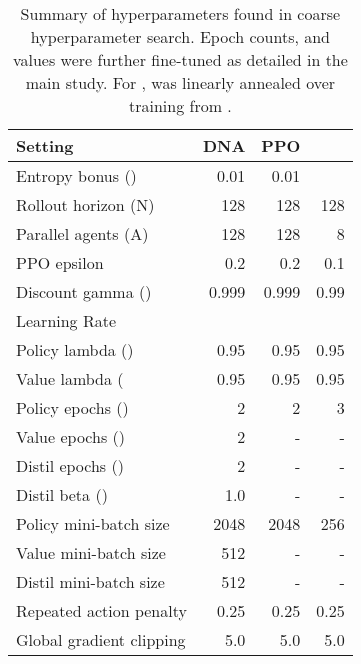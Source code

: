 \documentclass{article}
\begin{document}
\begin{table}[h]
    \centering
    
    \begin{tabular}{l r r r }
    \toprule
        Setting & DNA & PPO &  \\
    \midrule
Entropy bonus ()   & 0.01 & 0.01 &   \\ 
        Rollout horizon (N)             & 128 & 128 & 128 \\
        Parallel agents (A)             & 128 & 128 & 8 \\
        PPO epsilon           & 0.2 & 0.2 & 0.1 \\
        Discount gamma ()       & 0.999 & 0.999 & 0.99 \\


        Learning Rate                   &  &  &  \\
        
        Policy lambda ()   & 0.95 & 0.95 & 0.95 \\ 
        Value lambda (     & 0.95 & 0.95 & 0.95 \\ 
        
        Policy epochs ()         & 2 & 2 & 3 \\
        Value epochs ()            & 2 & - & - \\
        Distil epochs ()           & 2 & - & - \\
        Distil beta ()           & 1.0 & - & - \\
        
        Policy mini-batch size          & 2048 & 2048 & 256 \\ 
        Value mini-batch size           & 512 & - & - \\
        Distil mini-batch size          & 512 & - & - \\
        Repeated action penalty         & 0.25 & 0.25 & 0.25 \\ 
        Global gradient clipping        & 5.0 & 5.0 & 5.0 \\ 
        
    \bottomrule
    \end{tabular}
        
    \caption{Summary of hyperparameters found in coarse hyperparameter search. Epoch counts, and  values were further fine-tuned as detailed in the main study. For ,  was linearly annealed over training from .}
    \label{tab:main_hps}
\end{table}
\end{document}
